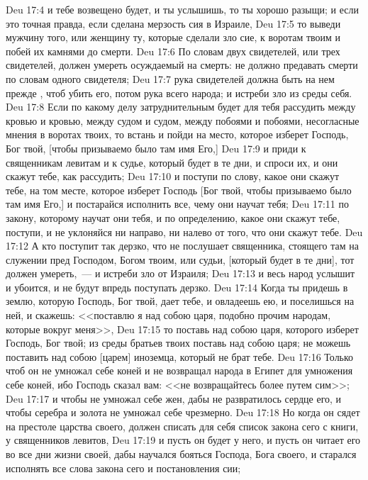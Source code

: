 \vs Deu 17:4 и тебе возвещено будет, и ты услышишь, то ты хорошо разыщи; и если это точная правда, если сделана мерзость сия в Израиле,
\vs Deu 17:5 то выведи мужчину того, или женщину ту, которые сделали зло сие, к воротам твоим и побей их камнями до смерти.
\vs Deu 17:6 По словам двух свидетелей, или трех свидетелей, должен умереть осуждаемый на смерть: не должно предавать смерти по словам одного свидетеля;
\vs Deu 17:7 рука свидетелей должна быть на нем прежде , чтоб убить его, потом рука всего народа; и  истреби зло из среды себя.
\vs Deu 17:8 Если по какому делу затруднительным будет для тебя рассудить между кровью и кровью, между судом и судом, между побоями и побоями,  несогласные мнения в воротах твоих, то встань и пойди на место, которое изберет Господь, Бог твой, [чтобы призываемо было там имя Его,]
\vs Deu 17:9 и приди к священникам левитам и к судье, который будет в те дни, и спроси их, и они скажут тебе, как рассудить;
\vs Deu 17:10 и поступи по слову, какое они скажут тебе, на том месте, которое изберет Господь [Бог твой, чтобы призываемо было там имя Его,] и постарайся исполнить все, чему они научат тебя;
\vs Deu 17:11 по закону, которому научат они тебя, и по определению, какое они скажут тебе, поступи, и не уклоняйся ни направо, ни налево от того, что они скажут тебе.
\vs Deu 17:12 А кто поступит так дерзко, что не послушает священника, стоящего там на служении пред Господом, Богом твоим, или судьи, [который будет в те дни], тот должен умереть,~--- и  истреби зло от Израиля;
\vs Deu 17:13 и весь народ услышит и убоится, и не будут впредь поступать дерзко.
\rsbpar\vs Deu 17:14 Когда ты придешь в землю, которую Господь, Бог твой, дает тебе, и овладеешь ею, и поселишься на ней, и скажешь: <<поставлю я над собою царя, подобно прочим народам, которые вокруг меня>>,
\vs Deu 17:15 то поставь над собою царя, которого изберет Господь, Бог твой; из среды братьев твоих поставь над собою царя; не можешь поставить над собою [царем] иноземца, который не брат тебе.
\vs Deu 17:16 Только чтоб он не умножал себе коней и не возвращал народа в Египет для умножения себе коней, ибо Господь сказал вам: <<не возвращайтесь более путем сим>>;
\vs Deu 17:17 и чтобы не умножал себе жен, дабы не развратилось сердце его, и чтобы серебра и золота не умножал себе чрезмерно.
\vs Deu 17:18 Но когда он сядет на престоле царства своего, должен списать для себя список закона сего с книги,  у священников левитов,
\vs Deu 17:19 и пусть он будет у него, и пусть он читает его во все дни жизни своей, дабы научался бояться Господа, Бога своего, и старался исполнять все слова закона сего и постановления сии;
